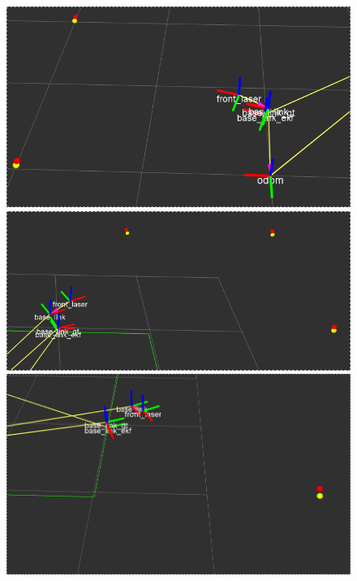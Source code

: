 \begin{figure}[!htb]
  \includegraphics[width=\linewidth]{imagenesEKF/K1/1.png}
\endminipage\hfill
{}
  \includegraphics[width=\linewidth]{imagenesEKF/K1/3.png}
\endminipage\hfill
{}%
  \includegraphics[width=\linewidth]{imagenesEKF/K1/4.png}
\endminipage
\end{figure}
\FloatBarrier

